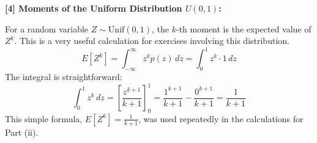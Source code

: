 \documentclass[11pt,a4paper]{article}
\begin{document}
\vspace{1cm}
\hypertarget{note4}{\textbf{[4] Moments of the Uniform Distribution $U(0,1)$:}}
For a random variable $Z \sim \text{Unif}(0,1)$, the $k$-th moment is the expected value of $Z^k$. This is a very useful calculation for exercises involving this distribution.
\[ E[Z^k] = \int_{-\infty}^{\infty} z^k p(z) \,dz = \int_0^1 z^k \cdot 1 \,dz \]
The integral is straightforward:
\[ \int_0^1 z^k \,dz = \left[ \frac{z^{k+1}}{k+1} \right]_0^1 = \frac{1^{k+1}}{k+1} - \frac{0^{k+1}}{k+1} = \frac{1}{k+1} \]
This simple formula, $E[Z^k] = \frac{1}{k+1}$, was used repeatedly in the calculations for Part (ii).
\end{document}
